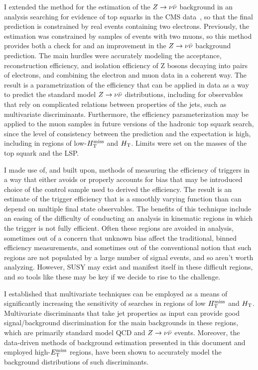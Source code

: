 I extended the method for the estimation of the $Z\rightarrow \nu\bar{\nu}$ background in an analysis searching for evidence of top squarks in the CMS data~\cite{CMS:2016nhb}, so that the final prediction is constrained by real events containing two electrons. Previously, the estimation was constrained by samples of events with two muons, so this method provides both a check for and an improvement in the $Z\rightarrow \nu\bar{\nu}$ background prediction. The main hurdles were accurately modeling the acceptance, reconstruction efficiency, and isolation efficiency of Z bosons decaying into pairs of electrons, and combining the electron and muon data in a coherent way. The result is a parametrization of the efficiency that can be applied in data as a way to predict the standard model $Z\rightarrow \nu\bar{\nu}$ distributions, including for observables that rely on complicated relations between properties of the jets, such as multivariate discriminants. Furthermore, the efficiency parameterization may be applied to the muon samples in future versions of the hadronic top squark search, since the level of consistency between the prediction and the expectation is high, including in regions of low-$H_{\text{T}}^{\rm miss}$ and $H_{\rm T}$. Limits were set on the masses of the top squark and the LSP. 

I made use of, and built upon, methods of measuring the efficiency of triggers in a way that either avoids or properly accounts for bias that may be introduced choice of the control sample used to derived the efficiency. The result is an estimate of the trigger efficiency that is a smoothly varying function than can depend on multiple final state observables.  The benefits of this technique include an easing of the difficulty of conducting an analysis in kinematic regions in which the trigger is not fully efficient. Often these regions are avoided in analysis, sometimes out of a concern that unknown bias affect the traditional, binned efficiency measurements, and sometimes out of the conventional notion that such regions are not populated by a large number of signal events, and so aren't worth analyzing. However, SUSY may exist and manifest itself in these difficult regions, and so tools like these may be key if we decide to rise to the challenge.

I established that multivariate techniques can be employed as a means of significantly increasing the sensitivity of searches in regions of low $H_{\text{T}}^{\rm miss}$ and $H_{\rm T}$. Multivariate discriminants that take jet properties as input can provide good signal/background discrimination for the main backgrounds in these regions, which are primarily standard model QCD and $Z\rightarrow \nu\bar{\nu}$ events. Moreover, the data-driven methods of background estimation presented in this document and employed high-$E_{\text{T}}^{\rm miss}$ regions, have been shown to accurately model the background distributions of such discriminants.

